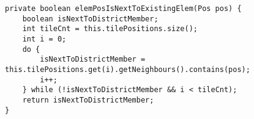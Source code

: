 \begin{lstlisting}[style=CodeHighlighting,float,caption=District - elemPosIsNextToExistingElem,label=lst:district_elemPosIsNextToExistingElem]
private boolean elemPosIsNextToExistingElem(Pos pos) {
    boolean isNextToDistrictMember;
    int tileCnt = this.tilePositions.size();
    int i = 0;
    do {
        isNextToDistrictMember = this.tilePositions.get(i).getNeighbours().contains(pos);
        i++;
    } while (!isNextToDistrictMember && i < tileCnt);
    return isNextToDistrictMember;
}
\end{lstlisting}